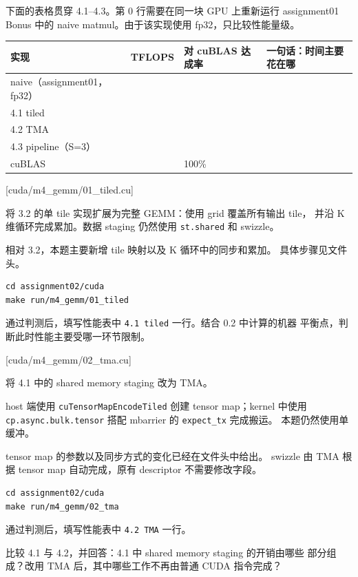 \documentclass[11pt,a4paper,fontset=fandol]{ctexart}
\begin{document}
下面的表格贯穿 4.1--4.3。第 0 行需要在同一块 GPU 上重新运行 assignment01
Bonus 中的 naive matmul。由于该实现使用 fp32，只比较性能量级。

\begin{longtable}[]{@{}llll@{}}
\toprule\noalign{}
实现 & TFLOPS & 对 cuBLAS 达成率 & 一句话：时间主要花在哪 \\
\midrule\noalign{}
\endhead
\bottomrule\noalign{}
\endlastfoot
naive（assignment01，fp32） & & & \\
4.1 tiled & & & \\
4.2 TMA & & & \\
4.3 pipeline（S=3） & & & \\
cuBLAS & & 100\% & \\
\end{longtable}

[cuda/m4\_gemm/01\_tiled.cu]

将 3.2 的单 tile 实现扩展为完整 GEMM：使用 grid 覆盖所有输出 tile， 并沿
K 维循环完成累加。数据 staging 仍然使用 \texttt{st.shared} 和 swizzle。

相对 3.2，本题主要新增 tile 映射以及 K 循环中的同步和累加。
具体步骤见文件头。

\begin{verbatim}
cd assignment02/cuda
make run/m4_gemm/01_tiled
\end{verbatim}

通过判测后，填写性能表中 \texttt{4.1\ tiled} 一行。结合 0.2 中计算的机器
平衡点，判断此时性能主要受哪一环节限制。

[cuda/m4\_gemm/02\_tma.cu]

将 4.1 中的 shared memory staging 改为 TMA。

host 端使用 \texttt{cuTensorMapEncodeTiled} 创建 tensor map；kernel
中使用 \texttt{cp.async.bulk.tensor} 搭配 mbarrier 的
\texttt{expect\_tx} 完成搬运。 本题仍然使用单缓冲。

tensor map 的参数以及同步方式的变化已经在文件头中给出。 swizzle 由 TMA
根据 tensor map 自动完成，原有 descriptor 不需要修改字段。

\begin{verbatim}
cd assignment02/cuda
make run/m4_gemm/02_tma
\end{verbatim}

通过判测后，填写性能表中 \texttt{4.2\ TMA} 一行。

比较 4.1 与 4.2，并回答：4.1 中 shared memory staging 的开销由哪些
部分组成？改用 TMA 后，其中哪些工作不再由普通 CUDA 指令完成？
\end{document}
